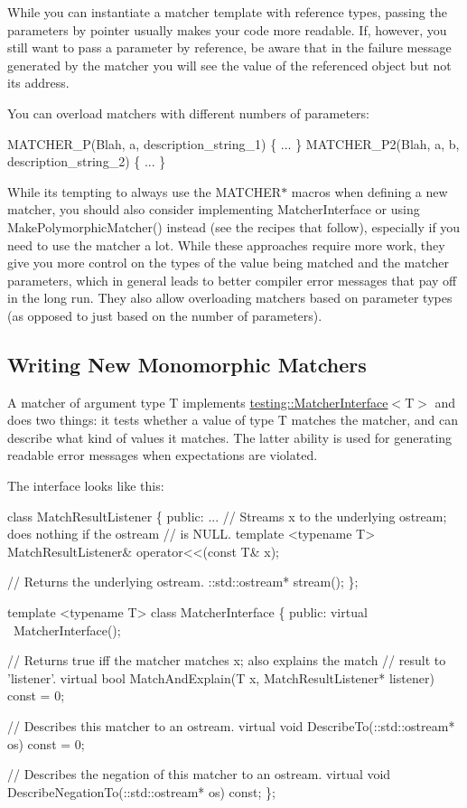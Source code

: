 While you can instantiate a matcher template with reference types, passing the parameters by pointer usually makes your code more readable. If, however, you still want to pass a parameter by reference, be aware that in the failure message generated by the matcher you will see the value of the referenced object but not its address.

You can overload matchers with different numbers of parameters\+: 
\begin{DoxyCode}
MATCHER\_P(Blah, a, description\_string\_1) \{ ... \}
MATCHER\_P2(Blah, a, b, description\_string\_2) \{ ... \}
\end{DoxyCode}


While it\textquotesingle{}s tempting to always use the {\ttfamily M\+A\+T\+C\+H\+E\+R$\ast$} macros when defining a new matcher, you should also consider implementing {\ttfamily Matcher\+Interface} or using {\ttfamily Make\+Polymorphic\+Matcher()} instead (see the recipes that follow), especially if you need to use the matcher a lot. While these approaches require more work, they give you more control on the types of the value being matched and the matcher parameters, which in general leads to better compiler error messages that pay off in the long run. They also allow overloading matchers based on parameter types (as opposed to just based on the number of parameters).

\subsection*{Writing New Monomorphic Matchers}

A matcher of argument type {\ttfamily T} implements {\ttfamily \hyperlink{classtesting_1_1_matcher_interface}{testing\+::\+Matcher\+Interface}$<$T$>$} and does two things\+: it tests whether a value of type {\ttfamily T} matches the matcher, and can describe what kind of values it matches. The latter ability is used for generating readable error messages when expectations are violated.

The interface looks like this\+:


\begin{DoxyCode}
class MatchResultListener \{
 public:
  ...
  // Streams x to the underlying ostream; does nothing if the ostream
  // is NULL.
  template <typename T>
  MatchResultListener& operator<<(const T& x);

  // Returns the underlying ostream.
  ::std::ostream* stream();
\};

template <typename T>
class MatcherInterface \{
 public:
  virtual ~MatcherInterface();

  // Returns true iff the matcher matches x; also explains the match
  // result to 'listener'.
  virtual bool MatchAndExplain(T x, MatchResultListener* listener) const = 0;

  // Describes this matcher to an ostream.
  virtual void DescribeTo(::std::ostream* os) const = 0;

  // Describes the negation of this matcher to an ostream.
  virtual void DescribeNegationTo(::std::ostream* os) const;
\};
\end{DoxyCode}


